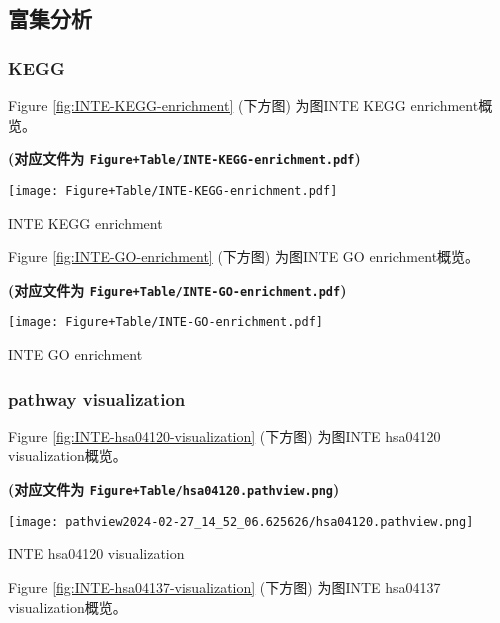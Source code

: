 \documentclass[
]{article}
\begin{document}
\hypertarget{ux5bccux96c6ux5206ux6790}{%
\subsection{富集分析}\label{ux5bccux96c6ux5206ux6790}}

\hypertarget{kegg}{%
\subsubsection{KEGG}\label{kegg}}

Figure \ref{fig:INTE-KEGG-enrichment} (下方图) 为图INTE KEGG enrichment概览。

\textbf{(对应文件为 \texttt{Figure+Table/INTE-KEGG-enrichment.pdf})}

\def\@captype{figure}
\begin{center}
\texttt{[image: Figure+Table/INTE-KEGG-enrichment.pdf]}
\caption{INTE KEGG enrichment}\label{fig:INTE-KEGG-enrichment}
\end{center}

Figure \ref{fig:INTE-GO-enrichment} (下方图) 为图INTE GO enrichment概览。

\textbf{(对应文件为 \texttt{Figure+Table/INTE-GO-enrichment.pdf})}

\def\@captype{figure}
\begin{center}
\texttt{[image: Figure+Table/INTE-GO-enrichment.pdf]}
\caption{INTE GO enrichment}\label{fig:INTE-GO-enrichment}
\end{center}

\hypertarget{pathway-visualization}{%
\subsubsection{pathway visualization}\label{pathway-visualization}}

Figure \ref{fig:INTE-hsa04120-visualization} (下方图) 为图INTE hsa04120 visualization概览。

\textbf{(对应文件为 \texttt{Figure+Table/hsa04120.pathview.png})}

\def\@captype{figure}
\begin{center}
\texttt{[image: pathview2024-02-27\_14\_52\_06.625626/hsa04120.pathview.png]}
\caption{INTE hsa04120 visualization}\label{fig:INTE-hsa04120-visualization}
\end{center}

Figure \ref{fig:INTE-hsa04137-visualization} (下方图) 为图INTE hsa04137 visualization概览。
\end{document}
